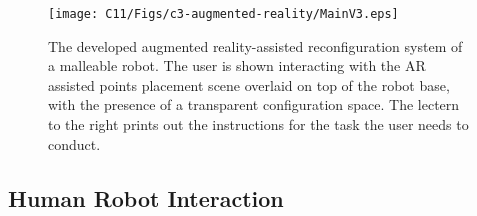 \begin{figure}[t!]
    \centering
    \texttt{[image: C11/Figs/c3-augmented-reality/MainV3.eps]}
    \caption{The developed augmented reality-assisted reconfiguration system of a malleable robot. The user is shown interacting with the AR assisted points placement scene overlaid on top of the robot base, with the presence of a transparent configuration space. The lectern to the right prints out the instructions for the task the user needs to conduct.}
    \label{main}
\end{figure}



\subsection{Human Robot Interaction}


